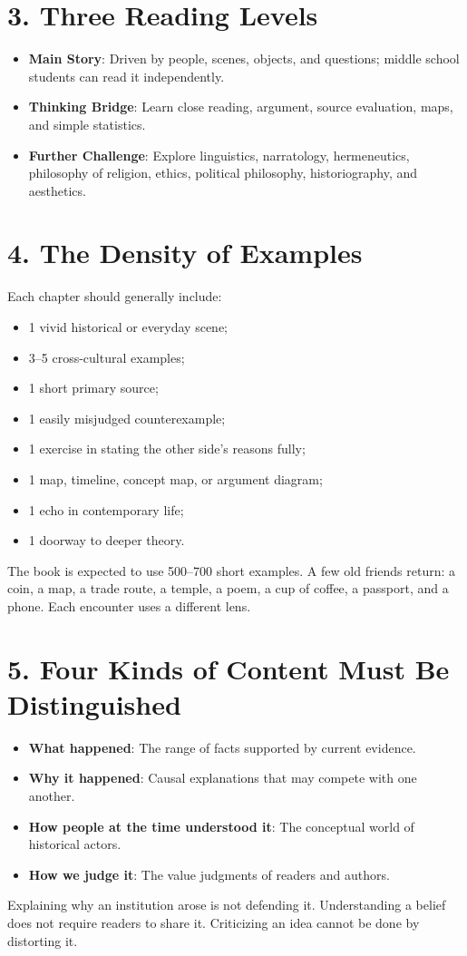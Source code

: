 \section*{3. Three Reading Levels}
\begin{itemize}
\item \textbf{Main Story}: Driven by people, scenes, objects, and questions; middle school students can read it independently.
\item \textbf{Thinking Bridge}: Learn close reading, argument, source evaluation, maps, and simple statistics.
\item \textbf{Further Challenge}: Explore linguistics, narratology, hermeneutics, philosophy of religion, ethics, political philosophy, historiography, and aesthetics.
\end{itemize}
\section*{4. The Density of Examples}
Each chapter should generally include:

\begin{itemize}
\item 1 vivid historical or everyday scene;
\item 3--5 cross-cultural examples;
\item 1 short primary source;
\item 1 easily misjudged counterexample;
\item 1 exercise in stating the other side's reasons fully;
\item 1 map, timeline, concept map, or argument diagram;
\item 1 echo in contemporary life;
\item 1 doorway to deeper theory.
\end{itemize}
The book is expected to use 500--700 short examples. A few old friends return: a coin, a map, a trade route, a temple, a poem, a cup of coffee, a passport, and a phone. Each encounter uses a different lens.

\section*{5. Four Kinds of Content Must Be Distinguished}
\begin{itemize}
\item \textbf{What happened}: The range of facts supported by current evidence.
\item \textbf{Why it happened}: Causal explanations that may compete with one another.
\item \textbf{How people at the time understood it}: The conceptual world of historical actors.
\item \textbf{How we judge it}: The value judgments of readers and authors.
\end{itemize}
Explaining why an institution arose is not defending it. Understanding a belief does not require readers to share it. Criticizing an idea cannot be done by distorting it.

